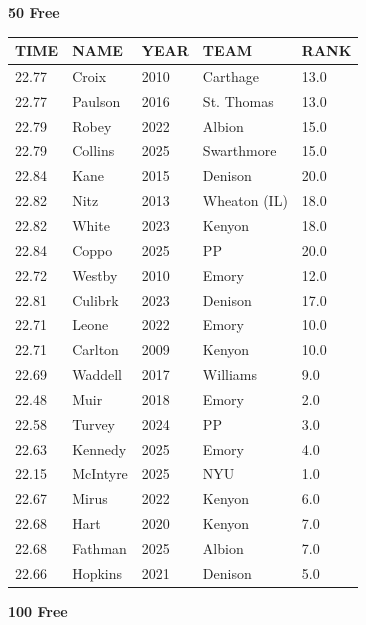 \begin{table}[H]
\centering
\begin{minipage}[t]{0.48\textwidth}
\centering
\textbf{50 Free}\\[0.1cm]
\begin{tabular}{@{}p{1.8cm}p{2.8cm}p{1.2cm}p{1.4cm}p{0.8cm}@{}}
\hline
    \textbf{TIME} & \textbf{NAME} & \textbf{YEAR} & \textbf{TEAM} & \textbf{RANK} \\
\hline
    22.77 & Croix & 2010 & Carthage & 13.0 \\
    22.77 & Paulson & 2016 & St. Thomas & 13.0 \\
    22.79 & Robey & 2022 & Albion & 15.0 \\
    22.79 & Collins & 2025 & Swarthmore & 15.0 \\
    22.84 & Kane & 2015 & Denison & 20.0 \\
    22.82 & Nitz & 2013 & Wheaton (IL) & 18.0 \\
    22.82 & White & 2023 & Kenyon & 18.0 \\
    22.84 & Coppo & 2025 & PP & 20.0 \\
    22.72 & Westby & 2010 & Emory & 12.0 \\
    22.81 & Culibrk & 2023 & Denison & 17.0 \\
    22.71 & Leone & 2022 & Emory & 10.0 \\
    22.71 & Carlton & 2009 & Kenyon & 10.0 \\
    22.69 & Waddell & 2017 & Williams & 9.0 \\
    22.48 & Muir & 2018 & Emory & 2.0 \\
    22.58 & Turvey & 2024 & PP & 3.0 \\
    22.63 & Kennedy & 2025 & Emory & 4.0 \\
    22.15 & McIntyre & 2025 & NYU & 1.0 \\
    22.67 & Mirus & 2022 & Kenyon & 6.0 \\
    22.68 & Hart & 2020 & Kenyon & 7.0 \\
    22.68 & Fathman & 2025 & Albion & 7.0 \\
    22.66 & Hopkins & 2021 & Denison & 5.0 \\
\hline
\end{tabular}
\end{minipage}\hfill
\begin{minipage}[t]{0.48\textwidth}
\centering
\textbf{100 Free}\\[0.1cm]
\begin{tabular}{@{}p{1.8cm}p{2.8cm}p{1.2cm}p{1.4cm}p{0.8cm}@{}}

\end{tabular}
\end{minipage}
\end{table}
